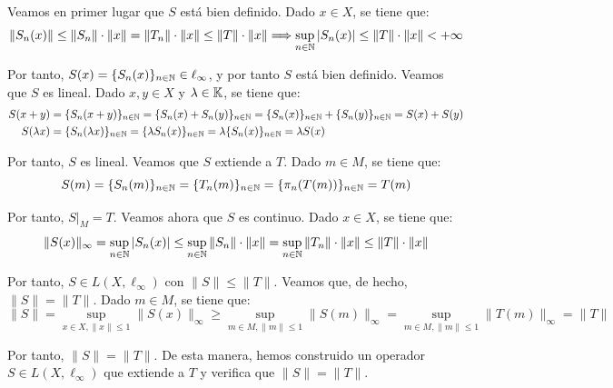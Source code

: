\begin{ejercicio}
    Veamos en primer lugar que $S$ está bien definido. Dado $x \in X$, se tiene que:
    \begin{equation*}
        \|S_n(x)\| \leq \|S_n\| \cdot \|x\| = \|T_n\| \cdot \|x\| \leq \|T\| \cdot \|x\|\Longrightarrow \sup_{n \in \mathbb{N}} |S_n(x)| \leq \|T\| \cdot \|x\| < +\infty
    \end{equation*}

    Por tanto, $S(x) = \{S_n(x)\}_{n \in \mathbb{N}} \in \ell_\infty$, y por tanto $S$ está bien definido. Veamos que $S$ es lineal. Dado $x, y \in X$ y $\lambda \in \mathbb{K}$, se tiene que:
    \begin{align*}
        S(x + y) &= \{S_n(x + y)\}_{n \in \mathbb{N}} = \{S_n(x) + S_n(y)\}_{n \in \mathbb{N}} = \{S_n(x)\}_{n \in \mathbb{N}} + \{S_n(y)\}_{n \in \mathbb{N}} = S(x) + S(y) \\
        S(\lambda x) &= \{S_n(\lambda x)\}_{n \in \mathbb{N}} = \{\lambda S_n(x)\}_{n \in \mathbb{N}} = \lambda \{S_n(x)\}_{n \in \mathbb{N}} = \lambda S(x)
    \end{align*}

    Por tanto, $S$ es lineal. Veamos que $S$ extiende a $T$. Dado $m \in M$, se tiene que:
    \begin{equation*}
        S(m) = \{S_n(m)\}_{n \in \mathbb{N}} = \{T_n(m)\}_{n \in \mathbb{N}} = \{\pi_n(T(m))\}_{n \in \mathbb{N}} = T(m)
    \end{equation*}

    Por tanto, $S|_M = T$. Veamos ahora que $S$ es continuo. Dado $x \in X$, se tiene que:
    \begin{equation*}
        \|S(x)\|_\infty = \sup_{n \in \mathbb{N}} |S_n(x)| \leq \sup_{n \in \mathbb{N}} \|S_n\| \cdot \|x\| = \sup_{n \in \mathbb{N}} \|T_n\| \cdot \|x\| \leq \|T\| \cdot \|x\|
    \end{equation*}

    Por tanto, $S \in L(X, \ell_\infty)$ con $\|S\| \leq \|T\|$. Veamos que, de hecho, $\|S\| = \|T\|$. Dado $m \in M$, se tiene que:
    \begin{equation*}
        \|S\| = \sup_{x \in X, \|x\| \leq 1} \|S(x)\|_\infty \geq \sup_{m \in M, \|m\| \leq 1} \|S(m)\|_\infty = \sup_{m \in M, \|m\| \leq 1} \|T(m)\|_\infty = \|T\|
    \end{equation*}

    Por tanto, $\|S\| = \|T\|$. De esta manera, hemos construido un operador $S \in L(X, \ell_\infty)$ que extiende a $T$ y verifica que $\|S\| = \|T\|$.
\end{ejercicio}

